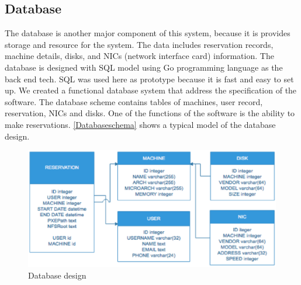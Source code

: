 \pagebreak
\subsection{Database}
The database is another major component of this system, because it is provides storage and resource for the system. The data includes reservation records, machine details, disks, and NICs (network interface card) information. The database is designed with SQL model using Go programming language as the back end tech. SQL was used here as prototype because it is fast and easy to set up. We created a functional database system that address the specification of the software. 
The database scheme contains tables of machines, user record, reservation, NICs and disks.  One of the functions of the software is the ability to make reservations. \autoref{Databaseschema} shows a typical model of the database design.
\begin{figure}[h!]
\includegraphics[width = \linewidth]{database.eps}
\caption{Database design}
\label{Databaseschema} 
\end{figure}
